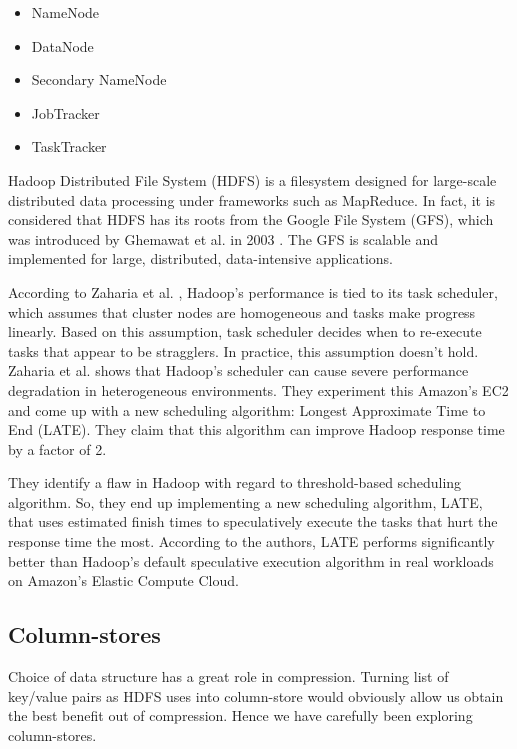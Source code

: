 \documentclass[twocolumn]{article}
\begin{document}
\begin{itemize}
\item NameNode
\item DataNode
\item Secondary NameNode
\item JobTracker
\item TaskTracker
\end{itemize}

Hadoop Distributed File System (HDFS) is a filesystem designed for large-scale distributed data
processing under frameworks such as MapReduce. In fact, it is considered that HDFS has its roots
from the Google File System (GFS), which was introduced by Ghemawat et al. in 2003 \cite{ref:gfs}.
The GFS is scalable and implemented for large, distributed, data-intensive applications.

According to Zaharia et al. \cite{ref:heterogeneous}, Hadoop's performance is tied to its task scheduler,
which assumes that cluster nodes are homogeneous and tasks make progress linearly. Based on this
assumption, task scheduler decides when to re-execute tasks that appear to be stragglers. In
practice, this assumption doesn't hold. Zaharia et al. shows that Hadoop's scheduler can cause
severe performance degradation in heterogeneous environments. They experiment this Amazon's EC2
and come up with a new scheduling algorithm: Longest Approximate Time to End (LATE). They
claim that this algorithm can improve Hadoop response time by a factor of 2.

They identify a flaw in Hadoop with regard to threshold-based scheduling algorithm. So,
they end up implementing a new scheduling algorithm, LATE, that uses estimated finish times
to speculatively execute the tasks that hurt the response time the most. According to the authors,
LATE performs significantly better than Hadoop’s default speculative execution algorithm in real
workloads on Amazon’s Elastic Compute Cloud.

\subsection{Column-stores}

Choice of data structure has a great role in compression. Turning list of key/value pairs as
HDFS uses into column-store would obviously allow us obtain the best benefit out of compression.
Hence we have carefully been exploring column-stores.
\end{document}
